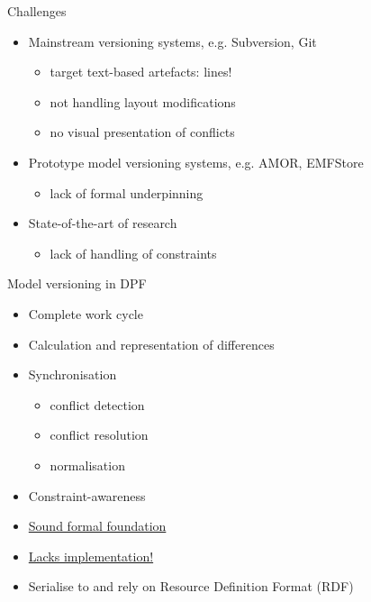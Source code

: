 \documentclass[dvips,slidetop,mathserif,brown]{beamer}
\begin{document}
\begin{frame}{Challenges}
  \begin{itemize}
    \item Mainstream versioning systems, e.g. Subversion, Git
    \begin{itemize}
      \item target text-based artefacts: lines!
      \item not handling layout modifications
      \item no visual presentation of conflicts 
    \end{itemize}
    \pause
    \item Prototype model versioning systems, e.g. AMOR, EMFStore
    \begin{itemize}
      \item lack of formal underpinning
    \end{itemize}
    \pause
    \item State-of-the-art of research
    \begin{itemize}
      \item lack of handling of constraints
    \end{itemize}
  \end{itemize}
\end{frame}

\begin{frame}{Model versioning in DPF}
  \begin{itemize}
    \item Complete work cycle
    \item Calculation and representation of differences
    \item Synchronisation
    \begin{itemize}
      \item conflict detection
      \item conflict resolution
      \item normalisation
    \end{itemize}
    \item Constraint-awareness
  \end{itemize}
  \begin{itemize}
      \item \underline{Sound formal foundation}
      \item \underline{Lacks implementation!}
      \item \centering Serialise to and rely on Resource Definition Format (RDF)
  \end{itemize}
\end{frame}
\end{document}
